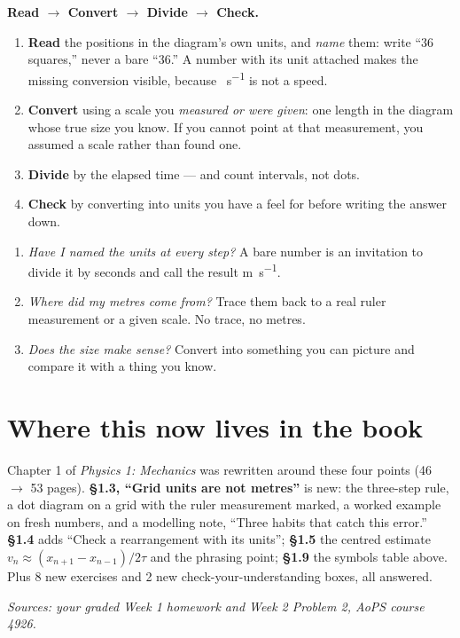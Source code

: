 \documentclass[11pt]{article}
\begin{document}
\begin{point}
\textbf{Read $\rightarrow$ Convert $\rightarrow$ Divide $\rightarrow$ Check.}
\begin{enumerate}
  \item \textbf{Read} the positions in the diagram's own units, and \emph{name} them:
        write ``\num{36} squares,'' never a bare ``\num{36}.'' A number with its unit
        attached makes the missing conversion visible, because \si{\per\second}
        is not a speed.
  \item \textbf{Convert} using a scale you \emph{measured or were given}: one length in
        the diagram whose true size you know. If you cannot point at that measurement,
        you assumed a scale rather than found one.
  \item \textbf{Divide} by the elapsed time --- and count intervals, not dots.
  \item \textbf{Check} by converting into units you have a feel for before writing the
        answer down.
\end{enumerate}
\end{point}

\begin{habit}
\begin{enumerate}
  \item \emph{Have I named the units at every step?} A bare number is an invitation to
        divide it by seconds and call the result \si{\metre\per\second}.
  \item \emph{Where did my metres come from?} Trace them back to a real ruler
        measurement or a given scale. No trace, no metres.
  \item \emph{Does the size make sense?} Convert into something you can picture and
        compare it with a thing you know.
\end{enumerate}
\end{habit}

\section{Where this now lives in the book}

Chapter 1 of \emph{Physics 1: Mechanics} was rewritten around these four points
(\num{46} $\rightarrow$ \num{53} pages). \textbf{\S1.3, ``Grid units are not metres''}
is new: the three-step rule, a dot diagram on a grid with the ruler measurement marked,
a worked example on fresh numbers, and a modelling note, ``Three habits that catch this
error.'' \textbf{\S1.4} adds ``Check a rearrangement with its units''; \textbf{\S1.5} the
centred estimate $v_n \approx (x_{n+1}-x_{n-1})/2\tau$ and the phrasing point;
\textbf{\S1.9} the symbols table above. Plus \num{8} new exercises and \num{2} new
check-your-understanding boxes, all answered.

\bigskip
\begin{center}
\small\itshape
Sources: your graded Week 1 homework and Week 2 Problem 2, AoPS course 4926.
\end{center}
\end{document}
